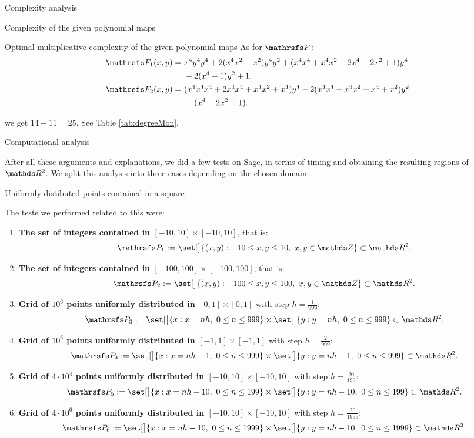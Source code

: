 \documentclass[11pt, a4paper, english, twoside, notitlepage, openright]{report}
\begin{document}
\begin{chapter}{Complexity analysis}
\begin{section}{Complexity of the given polynomial maps}
\begin{subsection}{Optimal multiplicative complexity of the given polynomial maps}
As for $\FFF$: 
\begin{align*}
\FFF_1(x,y) = &\  x^{4} y^{4}y^4 + 2   {(x^{4}x^2 - x^{2})} y^{4}y^2 + (x^{4}x^4 + x^{4}x^2 - 2   x^{4} - 2   x^{2} + 1) y^{4}\\
&\  - 2   {(x^{4} - 1)} y^{2} + 1, \\
\FFF_2(x,y) =&\ {(x^{4}x^4x^4 + 2   x^{4}x^4 + x^{4}x^2 + x^{4})} y^{4}  - 2   {(x^{4}x^4 + x^{4}x^2 + x^{4} + x^{2})} y^{2} \\
&\ + (x^{4}+ 2   x^{2} + 1).
\end{align*}

we get $14+11=25$. See Table \ref{tab:degreeMon}.

\end{subsection}

\end{section}

\begin{section}{Computational analysis}\label{5sect3}

After all these arguments and explanations, we did a few tests on Sage, in terms of timing and obtaining the resulting regions of $\R^2$. We split this analysis into three cases depending on the chosen domain.

\begin{subsection}{Uniformly distibuted points contained in a square}

The tests we performed related to this were:
\begin{enumerate}[1. ]
\item \textbf{The set of integers contained in $[-10, 10]\times[-10,10]$}, that is:
$$
\PP_1 := \set[\big]{(x,y): -10\le x,y\le 10,\ x, y\in \Z} \subset \R^2.
$$
\item \textbf{The set of integers contained in $[-100, 100]\times[-100,100]$}, that is:
$$
\PP_2 := \set[\big]{(x,y): -100\le x,y\le 100,\ x, y\in \Z} \subset \R^2.
$$
\item \textbf{Grid of $10^6$ points uniformly distributed in $[0, 1]\times[0,1]$} with step $h=\tfrac{1}{999}$:
$$
\PP_3 := \set[\big]{x: x = nh,\ 0\le n\le 999 } \times \set[\big]{y: y=nh,\ 0\le n\le 999 } \subset \R^2.
$$
\item \textbf{Grid of $10^6$ points uniformly distributed in $[-1, 1]\times[-1,1]$} with step $h=\tfrac{2}{999}$:
$$
\PP_4 := \set[\big]{x: x = nh -1,\ 0\le n\le 999 } \times \set[\big]{y: y=nh-1,\ 0\le n\le 999 } \subset \R^2.
$$
\item \textbf{Grid of $4\cdot 10^4$ points uniformly distributed in $[-10, 10]\times[-10,10]$} with step $h=\tfrac{20}{199}$:
$$
\PP_5:=\set[\big]{x:x=nh -10,\ 0\le n\le 199 }\times\set[\big]{y: y=nh-10,\ 0\le n\le199 }\subset\R^2.
$$
\item \textbf{Grid of $4\cdot 10^6$ points uniformly distributed in $[-10, 10]\times[-10,10]$} with step $h=\tfrac{20}{1999}$:
$$
\PP_6:=\set[\big]{x:x=nh -10,\ 0\le n\le 1999 }\times\set[\big]{y:y=nh-10,\ 0\le n\le 1999 }\subset \R^2.
$$
\end{enumerate}


\end{subsection}
\end{section}
\end{chapter}
\end{document}
